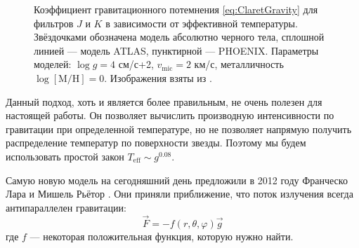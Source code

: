 \begin{figure}[h]
\centering
{}
\caption{Коэффициент гравитационного потемнения \eqref{eq:ClaretGravity} для фильтров $J$ и $K$ в зависимости от эффективной температуры.
Звёздочками обозначена модель абсолютно черного тела, сплошной линией --- модель ATLAS, пунктирной --- PHOENIX. Параметры моделей: $\log g = 4$ см/с+2, $v_\text{mic} = 2$ км/с, металличность $\log [\text{M}/\text{H}] = 0$.
Изображения взяты из \cite{ClaretGravity}.}
\label{fig:ClaretGravity}
\end{figure}

Данный подход, хоть и является более правильным, не очень полезен для настоящей работы. Он позволяет вычислить производную интенсивности по гравитации при определенной температуре, но не позволяет напрямую получить распределение температур по поверхности звезды. Поэтому мы будем использовать простой закон $T_\text{eff} \sim g^{0.08}$.



Самую новую модель на сегодняшний день предложили в 2012 году Франческо Лара и Мишель Рьётор \cite{LaraRieutord}. Они приняли приближение, что поток излучения всегда антипараллелен гравитации:
\[
\vec F = -f(r, \theta, \varphi) \vec g
\]
где $f$ --- некоторая положительная функция, которую нужно найти.

